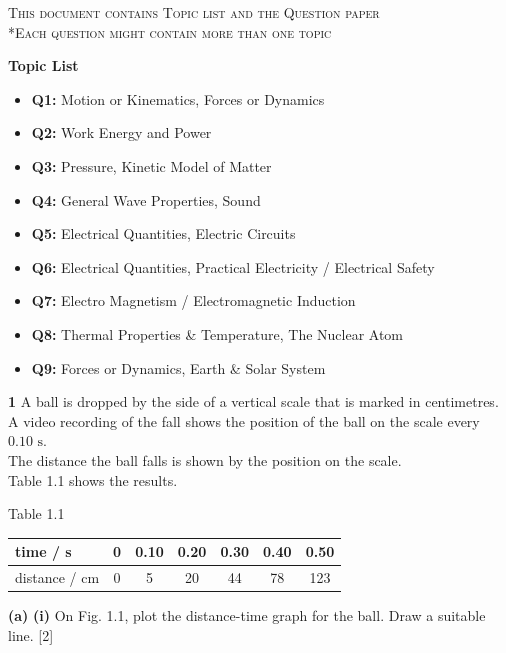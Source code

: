 \documentclass[11pt]{article}
\begin{document}
\begin{center}
	\textsc{This document contains Topic list and the Question paper}\\
	\textsc{*Each question might contain more than one topic }
\end{center}

\textbf{Topic List}
\begin{itemize}
    \item \textbf{Q1:} Motion or Kinematics, Forces or Dynamics
    \item \textbf{Q2:} Work Energy and Power
    \item \textbf{Q3:} Pressure, Kinetic Model of Matter
    \item \textbf{Q4:} General Wave Properties, Sound
    \item \textbf{Q5:} Electrical Quantities, Electric Circuits
    \item \textbf{Q6:} Electrical Quantities, Practical Electricity / Electrical Safety
    \item \textbf{Q7:} Electro Magnetism / Electromagnetic Induction
    \item \textbf{Q8:} Thermal Properties \& Temperature, The Nuclear Atom
    \item \textbf{Q9:} Forces or Dynamics, Earth \& Solar System
\end{itemize}
\newpage
\textbf{1} \quad A ball is dropped by the side of a vertical scale that is marked in centimetres.\\
A video recording of the fall shows the position of the ball on the scale every $0.10\text{ s}$.\\
The distance the ball falls is shown by the position on the scale.\\
Table 1.1 shows the results.

\begin{center}
Table 1.1\\[1ex]
\renewcommand{\arraystretch}{1.5}
\begin{tabular}{|l|c|c|c|c|c|c|}
\hline
time / s & 0 & 0.10 & 0.20 & 0.30 & 0.40 & 0.50 \\
\hline
distance / cm & 0 & 5 & 20 & 44 & 78 & 123 \\
\hline
\end{tabular}
\end{center}

\vspace{0.5cm}
\textbf{(a)} \textbf{(i)} \quad On Fig. 1.1, plot the distance-time graph for the ball. Draw a suitable line.
\hfill [2]
\end{document}
